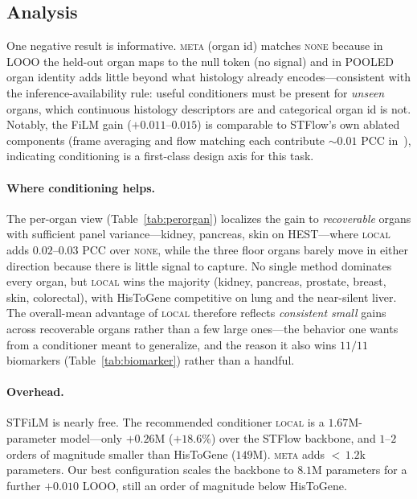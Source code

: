 \documentclass[10pt,twocolumn,letterpaper]{article}
\begin{document}
\subsection{Analysis}
\label{sec:analysis}
One negative result is informative. \textsc{meta} (organ id) matches \textsc{none} because in
LOOO the held-out organ maps to the null token (no signal) and in POOLED organ identity adds
little beyond what histology already encodes---consistent with the inference-availability rule:
useful conditioners must be present for \emph{unseen} organs, which continuous histology
descriptors are and categorical organ id is not. Notably, the FiLM gain
($+0.011$--$0.015$) is comparable to STFlow's own ablated components (frame averaging and flow
matching each contribute ${\sim}0.01$ PCC in~\cite{stflow}), indicating conditioning is a
first-class design axis for this task.

\paragraph{Where conditioning helps.} The per-organ view (Table~\ref{tab:perorgan}) localizes the
gain to \emph{recoverable} organs with sufficient panel variance---kidney, pancreas, skin on
HEST---where \textsc{local} adds $0.02$--$0.03$ PCC over \textsc{none}, while the three floor organs
barely move in either direction because there is little signal to capture. No single method
dominates every organ, but \textsc{local} wins the majority (kidney, pancreas, prostate, breast,
skin, colorectal), with HisToGene competitive on lung and the near-silent liver. The
overall-mean advantage of \textsc{local} therefore reflects
\emph{consistent small} gains across recoverable organs rather than a few large ones---the behavior
one wants from a conditioner meant to generalize, and the reason it also wins $11/11$ biomarkers
(Table~\ref{tab:biomarker}) rather than a handful.

\paragraph{Overhead.} STFiLM is nearly free. The recommended conditioner \textsc{local} is a
$1.67$M-parameter model---only $+0.26$M ($+18.6\%$) over the STFlow backbone, and $1$--$2$ orders
of magnitude smaller than HisToGene ($149$M). \textsc{meta} adds ${<}\,1.2$k parameters. Our best configuration scales the backbone to
$8.1$M parameters for a further $+0.010$ LOOO, still an order of magnitude below HisToGene.
\end{document}
